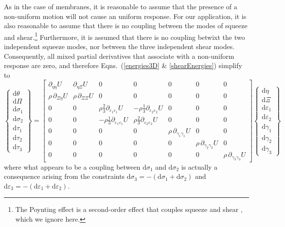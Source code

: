 As in the case of membranes, it is reasonable to assume that the presence of a non-uniform motion will not cause an uniform response.  For our application, it is also reasonable to assume that there is no coupling between the modes of squeeze and shear.\footnote{
   The Poynting effect is a second-order effect that couples squeeze and shear \cite{FreedZamani19}, which we ignore here.
}
Furthermore, it is assumed that there is no coupling betwixt the two independent squeeze modes, nor between the three independent shear modes.  Consequently, all mixed partial derivatives that associate with a non-uniform response are zero, and therefore Eqns.~(\ref{energies3D} \& \ref{shearEnergies}) simplify to
\small
\begin{equation}
\left\{ \begin{matrix}
\mathrm{d} \theta \\ \mathrm{d} \Pi \\
\mathrm{d} \sigma_1 \\ \mathrm{d} \sigma_2 \\ 
\mathrm{d} \tau_1 \\ \mathrm{d} \tau_2 \\ \mathrm{d} \tau_3
\end{matrix} \right\} = \begin{bmatrix}
\partial_{\eta\eta} U & \partial_{\eta\Xi} U & 0 & 0 & 0 & 0 & 0 \\
\rho \, \partial_{\Xi\eta} U & \rho \, \partial_{\Xi\Xi} U & 0 & 0 & 0 & 0 & 0 \\
0 & 0 & \rho \tfrac{2}{3} \partial_{\varepsilon_1 \varepsilon_1} U & -\rho \tfrac{1}{3} \partial_{\varepsilon_2 \varepsilon_2} U & 0 & 0 & 0 \\
0 & 0 & -\rho \tfrac{1}{3} \partial_{\varepsilon_1 \varepsilon_1} U & \rho \tfrac{2}{3} \partial_{\varepsilon_2 \varepsilon_2} U & 0 & 0 & 0 \\
0 & 0 & 0 & 0 & \rho \, \partial_{\gamma_1\gamma_1} U & 0 & 0 \\
0 & 0 & 0 & 0 & 0 & \rho \, \partial_{\gamma_2\gamma_2} U & 0 \\
0 & 0 & 0 & 0 & 0 & 0 & \rho \, \partial_{\gamma_3\gamma_3} U
\end{bmatrix}
\left\{ \begin{matrix}
\mathrm{d}\eta \\ \mathrm{d} \Xi \\
\mathrm{d} \varepsilon_1 \\ \mathrm{d} \varepsilon_2 \\
\mathrm{d} \gamma_1 \\ \mathrm{d} \gamma_2 \\ \mathrm{d} \gamma_3
\end{matrix} \right\}
\label{hypoelastic3D}
\end{equation}
\normalsize
where what appears to be a coupling between $\mathrm{d} \sigma_1$ and $\mathrm{d} \sigma_2$ is actually a consequence arising from the constraints $\mathrm{d} \sigma_3 = -( \mathrm{d} \sigma_1 + \mathrm{d} \sigma_2 )$ and $\mathrm{d} \varepsilon_3 = -( \mathrm{d} \varepsilon_1 + \mathrm{d} \varepsilon_2 )$.

